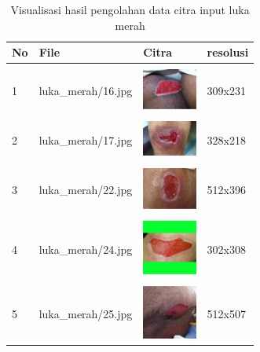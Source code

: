 \begin{table}[H]
	\centering
	\caption{Visualisasi hasil pengolahan data citra input luka merah}
	\label{tabel_input_8}
	\begin{tabular}{|m{0.2in}|m{1.2in}|m{0.7in}|m{0.7in}|}
		\hline
		\textbf{No} & \textbf{File} & \textbf{Citra} & \textbf{resolusi} \\
		\hline
		
		& &  &  \\
		1 & 
		luka\_merah/16.jpg &
		\includegraphics[width=0.7in]{gambar/dataset_citra/luka_merah/16.jpg}&
		309x231\\
		\hline
		
		& &  &  \\
		2& 
		luka\_merah/17.jpg &
		\includegraphics[width=0.7in]{gambar/dataset_citra/luka_merah/17.jpg}&
		328x218\\
		\hline
		
		& &  &  \\
		3& 
		luka\_merah/22.jpg &
		\includegraphics[width=0.7in]{gambar/dataset_citra/luka_merah/22.jpg}&
		512x396\\
		\hline
		
		& &  &  \\
		4& 
		luka\_merah/24.jpg &
		\includegraphics[width=0.7in]{gambar/dataset_citra/luka_merah/24.jpg}&
		302x308\\
		\hline
		
		& &  &  \\
		5& 
		luka\_merah/25.jpg &
		\includegraphics[width=0.7in]{gambar/dataset_citra/luka_merah/25.jpg}&
		512x507\\
		\hline
		

\end{tabular}
\end{table}
